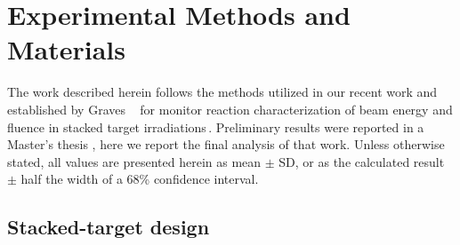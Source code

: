 % 
% 

\section{\label{sec:experimental_fe}Experimental Methods and Materials}


The work described herein follows the  methods utilized in our recent work and established by Graves \etal\ 
for monitor reaction characterization of beam energy and fluence in stacked target irradiations\,\cite{Voyles2018a,Graves2016}.
% 
% 
% 
Preliminary results  were reported in a Master's thesis \cite{springer2017investigation}, here we report the final analysis of that work.
Unless otherwise stated, all values are presented herein as mean $\pm$ SD, or as the calculated result $\pm$ half the width of a 68\% confidence interval.



\subsection{\label{sec:target_design_fe}Stacked-target design}



